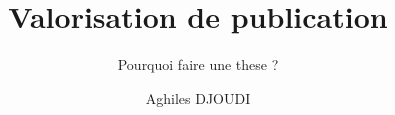 \documentclass[8pt]{beamer}
\title{Valorisation de publication}
\subtitle{Pourquoi faire une these ?}
\author{Aghiles DJOUDI}
\institute{PhD student\\ LIGM/ESIEE Paris \& ECE Research Lab Paris}
\begin{document}
\firstpage
\end{document}
